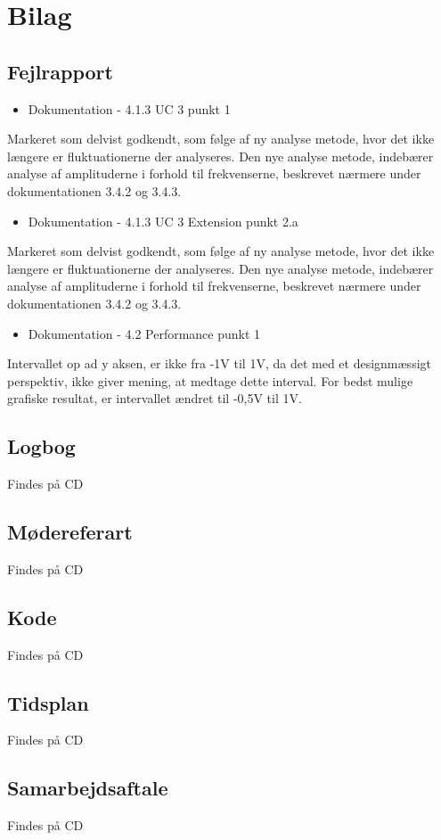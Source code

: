 \chapter{Bilag}
\section{Fejlrapport}
\begin{itemize}
	\item Dokumentation - 4.1.3 UC 3 punkt 1 
\end{itemize}
Markeret som delvist godkendt, som følge af ny analyse metode, hvor det ikke længere er fluktuationerne der analyseres. Den nye analyse metode, indebærer analyse af amplituderne i forhold til frekvenserne, beskrevet nærmere under dokumentationen 3.4.2 og 3.4.3. 
\begin{itemize}
	\item Dokumentation - 4.1.3 UC 3 Extension punkt 2.a 
\end{itemize}
Markeret som delvist godkendt, som følge af ny analyse metode, hvor det ikke længere er fluktuationerne der analyseres. Den nye analyse metode, indebærer analyse af amplituderne i forhold til frekvenserne, beskrevet nærmere under dokumentationen 3.4.2 og 3.4.3.
\begin{itemize}
	\item Dokumentation - 4.2 Performance punkt 1
\end{itemize}
Intervallet op ad y aksen, er ikke fra -1V til 1V, da det med et designmæssigt perspektiv, ikke giver mening, at medtage dette interval. For bedst mulige grafiske resultat, er intervallet ændret til -0,5V til 1V.


\section{Logbog}
Findes på CD

\section{Mødereferart}
Findes på CD

\section{Kode}
Findes på CD

\section{Tidsplan}
Findes på CD

\section{Samarbejdsaftale}
Findes på CD